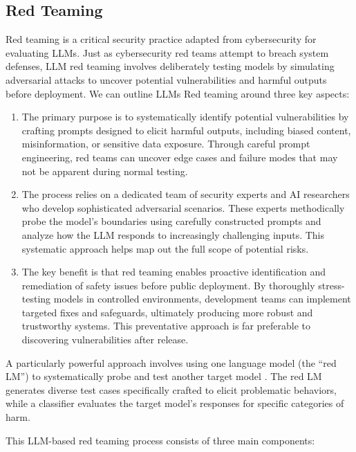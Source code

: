 \subsection{Red Teaming}

Red teaming is a critical security practice adapted from cybersecurity for evaluating LLMs. Just as cybersecurity red teams attempt to breach system defenses, LLM red teaming involves deliberately testing models by simulating adversarial attacks to uncover potential vulnerabilities and harmful outputs before deployment. We can outline LLMs Red teaming around three key aspects:

\begin{enumerate}
    \item The primary purpose is to systematically identify potential vulnerabilities by crafting prompts designed to elicit harmful outputs, including biased content, misinformation, or sensitive data exposure. Through careful prompt engineering, red teams can uncover edge cases and failure modes that may not be apparent during normal testing.
    \item The process relies on a dedicated team of security experts and AI researchers who develop sophisticated adversarial scenarios. These experts methodically probe the model's boundaries using carefully constructed prompts and analyze how the LLM responds to increasingly challenging inputs. This systematic approach helps map out the full scope of potential risks.
    \item The key benefit is that red teaming enables proactive identification and remediation of safety issues before public deployment. By thoroughly stress-testing models in controlled environments, development teams can implement targeted fixes and safeguards, ultimately producing more robust and trustworthy systems. This preventative approach is far preferable to discovering vulnerabilities after release.
\end{enumerate}

A particularly powerful approach involves using one language model (the ``red LM'') to systematically probe and test another target model . The red LM generates diverse test cases specifically crafted to elicit problematic behaviors, while a classifier evaluates the target model's responses for specific categories of harm.

This LLM-based red teaming process consists of three main components:

